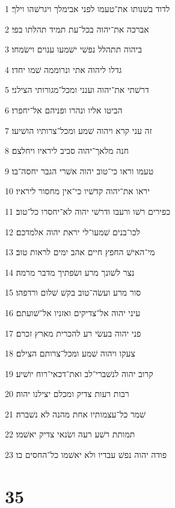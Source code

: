 \par 1 לדוד בשׁנותו את־טעמו לפני אבימלך ויגרשׁהו וילך׃
\par 2 אברכה את־יהוה בכל־עת תמיד תהלתו בפי׃
\par 3 ביהוה תתהלל נפשׁי ישׁמעו ענוים וישׂמחו׃
\par 4 גדלו ליהוה אתי ונרוממה שׁמו יחדו׃
\par 5 דרשׁתי את־יהוה וענני ומכל־מגורותי הצילני׃
\par 6 הביטו אליו ונהרו ופניהם אל־יחפרו׃
\par 7 זה עני קרא ויהוה שׁמע ומכל־צרותיו הושׁיעו׃
\par 8 חנה מלאך־יהוה סביב ליראיו ויחלצם׃
\par 9 טעמו וראו כי־טוב יהוה אשׁרי הגבר יחסה־בו׃
\par 10 יראו את־יהוה קדשׁיו כי־אין מחסור ליראיו׃
\par 11 כפירים רשׁו ורעבו ודרשׁי יהוה לא־יחסרו כל־טוב׃
\par 12 לכו־בנים שׁמעו־לי יראת יהוה אלמדכם׃
\par 13 מי־האישׁ החפץ חיים אהב ימים לראות טוב׃
\par 14 נצר לשׁונך מרע ושׂפתיך מדבר מרמה׃
\par 15 סור מרע ועשׂה־טוב בקשׁ שׁלום ורדפהו׃
\par 16 עיני יהוה אל־צדיקים ואזניו אל־שׁועתם׃
\par 17 פני יהוה בעשׂי רע להכרית מארץ זכרם׃
\par 18 צעקו ויהוה שׁמע ומכל־צרותם הצילם׃
\par 19 קרוב יהוה לנשׁברי־לב ואת־דכאי־רוח יושׁיע׃
\par 20 רבות רעות צדיק ומכלם יצילנו יהוה׃
\par 21 שׁמר כל־עצמותיו אחת מהנה לא נשׁברה׃
\par 22 תמותת רשׁע רעה ושׂנאי צדיק יאשׁמו׃
\par 23 פודה יהוה נפשׁ עבדיו ולא יאשׁמו כל־החסים בו׃

\chapter{35}

